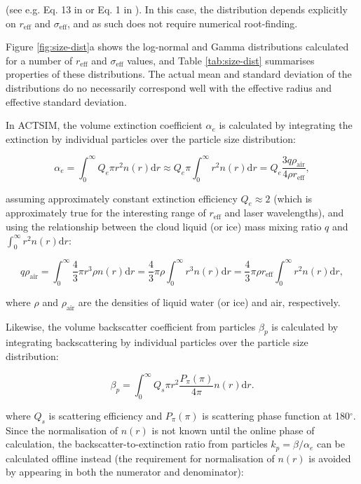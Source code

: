 (see e.g. Eq. 13 in \cite{petty2011}
or Eq. 1 in \cite{breon2005}). In this case, the distribution depends explicitly on $r_\text{eff}$ and
$\sigma_\text{eff}$, and as such does not require numerical root-finding.

Figure \ref{fig:size-dist}a shows the log-normal and Gamma distributions
calculated for a number of $r_\text{eff}$ and $\sigma_\text{eff}$ values,
and Table \ref{tab:size-dist} summarises properties of these distributions.
The actual mean and standard deviation of the distributions do no necessarily
correspond well with the effective radius and effective standard deviation.

In ACTSIM, the volume extinction coefficient $\alpha_e$
is calculated by integrating the extinction by individual particles over the
particle size distribution:

\begin{equation}
\alpha_e = 
\int_0^\infty Q_e\pi r^2 n(r) \mathrm{d}r \approx
Q_e\pi\int_0^\infty r^2 n(r) \mathrm{d}r =
Q_e \frac{3q\rho_\text{air}}{4\rho r_\text{eff}} ,
\end{equation}

assuming approximately constant extinction efficiency $Q_e \approx 2$ (which is approximately true for the interesting range of $r_\text{eff}$ and laser wavelengths), and using the
relationship between the cloud liquid (or ice) mass mixing ratio $q$
and $\int_0^\infty r^2 n(r) \mathrm{d}r$:

\begin{equation}
q\rho_\text{air} = \int_0^\infty \frac{4}{3}\pi r^3 \rho n(r)\mathrm{d}r = 
\frac{4}{3}\pi\rho\int_0^\infty r^3 n(r) \mathrm{d}r =
\frac{4}{3}\pi\rho r_\text{eff}\int_0^\infty r^2 n(r) \mathrm{d}r ,
\end{equation}

where $\rho$ and $\rho_\text{air}$ are the densities of liquid water (or ice)
and air, respectively.

Likewise, the volume backscatter coefficient
from particles $\beta_p$ is calculated by integrating backscattering by
individual particles over the particle size distribution:

\begin{equation}
\beta_p =
\int_0^\infty Q_s \pi r^2 \frac{P_\pi(\pi)}{4\pi} n(r) \mathrm{d}r .
\end{equation}

where $Q_s$ is scattering efficiency and $P_\pi(\pi)$ is scattering phase function
at 180$^\circ$.
Since the normalisation of $n(r)$ is not known until the online phase of calculation,
the backscatter-to-extinction ratio from particles $k_p = \beta/\alpha_e$ can be
calculated offline instead (the requirement for normalisation of $n(r)$ is
avoided by appearing in both the numerator and denominator):


